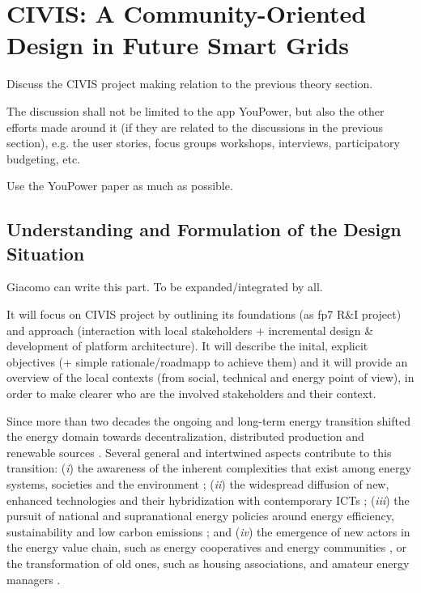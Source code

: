 \section{CIVIS: A Community-Oriented Design in Future Smart Grids}

\begin{svgraybox}
Discuss the CIVIS project making relation to the previous theory section. 

The discussion shall not be limited to the app YouPower, but also the other efforts made around it 
(if they are related to the discussions in the previous section), e.g. the user stories, focus 
groups workshops, interviews, participatory budgeting, etc. 

Use the YouPower paper as much as possible. 
\end{svgraybox}


\subsection{Understanding and Formulation of the Design Situation}
\begin{svgraybox}
[note by GP] Giacomo can write this part. To be expanded/integrated by all.

It will focus on CIVIS project by outlining its foundations (as fp7 R\&I project) and approach 
(interaction with local stakeholders + incremental design \& development of platform architecture). 
It will describe the inital, explicit objectives (+ simple rationale/roadmapp to achieve them) and 
it will provide an overview of the local contexts (from social, technical and energy point of view), 
in order to make clearer who are the involved stakeholders and their context.
\end{svgraybox}

Since more than two decades the ongoing and long-term energy transition shifted the energy domain
towards decentralization, distributed production and renewable sources \cite{rifkin_third_2011; 
sovacool_how_2016}. Several general and intertwined aspects contribute to this transition: 
(\textit{i}) the awareness of the inherent complexities that exist among energy systems, societies 
and the environment \cite{bulkeley_bringing_2012; umbach_global_2010}; (\textit{ii}) the
widespread diffusion of new, enhanced technologies and their hybridization with contemporary ICTs 
\cite{putrus_smart_2013; schick_innovating_2013}; (\textit{iii}) the pursuit of national and 
supranational energy policies around energy efficiency, sustainability and low carbon emissions 
\cite{da_graca_carvalho_eu_2012}; and (\textit{iv}) the emergence of new actors in the energy value 
chain, such as energy cooperatives and energy communities \cite{viardot_role_2013}, or the 
transformation of old ones, such as housing associations, and amateur energy managers 
\cite{hasselqvist_linking_2016}.

